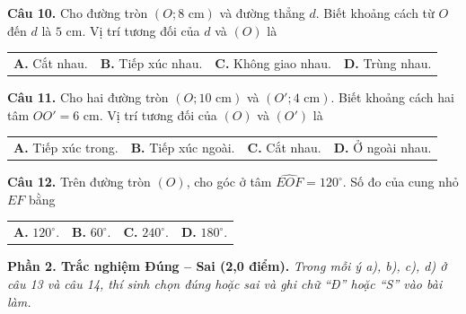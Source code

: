\documentclass[11pt,a4paper]{article}
\begin{document}
\vspace{1.5mm}
\textbf{Câu 10.} Cho đường tròn $(O; 8\text{ cm})$ và đường thẳng $d$. Biết khoảng cách từ $O$ đến $d$ là $5\text{ cm}$. Vị trí tương đối của $d$ và $(O)$ là\\
\begin{tabularx}{\linewidth}{XXXX}
\textbf{A.} Cắt nhau. & \textbf{B.} Tiếp xúc nhau. & \textbf{C.} Không giao nhau. & \textbf{D.} Trùng nhau.
\end{tabularx}

\vspace{1.5mm}
\textbf{Câu 11.} Cho hai đường tròn $(O; 10\text{ cm})$ và $(O'; 4\text{ cm})$. Biết khoảng cách hai tâm $OO' = 6\text{ cm}$. Vị trí tương đối của $(O)$ và $(O')$ là\\
\begin{tabularx}{\linewidth}{XXXX}
\textbf{A.} Tiếp xúc trong. & \textbf{B.} Tiếp xúc ngoài. & \textbf{C.} Cắt nhau. & \textbf{D.} Ở ngoài nhau.
\end{tabularx}

\vspace{1.5mm}
\textbf{Câu 12.} Trên đường tròn $(O)$, cho góc ở tâm $\widehat{EOF} = 120^\circ$. Số đo của cung nhỏ $EF$ bằng\\
\begin{tabularx}{\linewidth}{XXXX}
\textbf{A.} $120^\circ$. & \textbf{B.} $60^\circ$. & \textbf{C.} $240^\circ$. & \textbf{D.} $180^\circ$.
\end{tabularx}

\vspace{3mm}
\noindent
\textbf{Phần 2. Trắc nghiệm Đúng -- Sai (2,0 điểm).} \textit{Trong mỗi ý a), b), c), d) ở câu 13 và câu 14, thí sinh chọn đúng hoặc sai và ghi chữ ``Đ'' hoặc ``S'' vào bài làm.}
\end{document}
